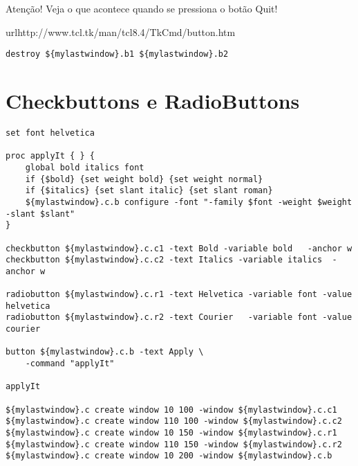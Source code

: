 Atenção! Veja o que acontece quando se pressiona o botão Quit!

url{http://www.tcl.tk/man/tcl8.4/TkCmd/button.htm}

\begin{lstlisting}
destroy ${mylastwindow}.b1 ${mylastwindow}.b2
\end{lstlisting}


\section{Checkbuttons e RadioButtons}

\begin{lstlisting}
set font helvetica

proc applyIt { } {
    global bold italics font
    if {$bold} {set weight bold} {set weight normal}
    if {$italics} {set slant italic} {set slant roman}
    ${mylastwindow}.c.b configure -font "-family $font -weight $weight -slant $slant"
}

checkbutton ${mylastwindow}.c.c1 -text Bold -variable bold   -anchor w
checkbutton ${mylastwindow}.c.c2 -text Italics -variable italics  -anchor w

radiobutton ${mylastwindow}.c.r1 -text Helvetica -variable font -value helvetica
radiobutton ${mylastwindow}.c.r2 -text Courier   -variable font -value courier   

button ${mylastwindow}.c.b -text Apply \
    -command "applyIt"

applyIt

${mylastwindow}.c create window 10 100 -window ${mylastwindow}.c.c1
${mylastwindow}.c create window 110 100 -window ${mylastwindow}.c.c2
${mylastwindow}.c create window 10 150 -window ${mylastwindow}.c.r1
${mylastwindow}.c create window 110 150 -window ${mylastwindow}.c.r2
${mylastwindow}.c create window 10 200 -window ${mylastwindow}.c.b
\end{lstlisting}


